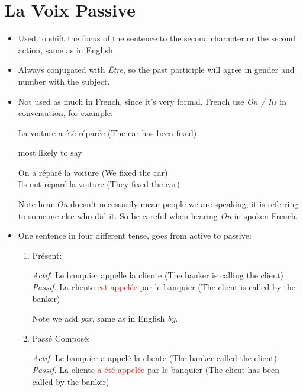 \documentclass{book}
\begin{document}
\chapter{La Voix Passive}
    \begin{itemize}
        \item Used to shift the focus of the sentence to the second character or the second action, same as in English.
        \item Always conjugated with \textit{Être}, so the past participle will agree in gender and number with the subject.
        \item Not used as much in French, since it's very formal. French use \textit{On / Ils} in conversation, for example:
            \begin{center}
                La voiture a été réparée (The car has been fixed)
            \end{center}
            most likely to say 
            \begin{center}
                On a réparé la voiture (We fixed the car) \\
                Ils ont réparé la voiture (They fixed the car)
            \end{center}
            Note hear \textit{On} doesn't necessarily mean people we are speaking, it is referring to someone else who did it. So be careful when hearing \textit{On} in spoken French.
        \item One sentence in four different tense, goes from active to passive:
            \begin{enumerate}
                \item Présent:
                    \begin{center}
                        \textit{Actif.} Le banquier appelle la cliente (The banker is calling the client) \\
                        \textit{Passif.} La cliente \textcolor{red}{est appelée} par le banquier (The client is called by the banker)
                    \end{center}
                    Note we add \textit{par}, same as in English \textit{by}.

                \item Passé Composé:
                    \begin{center}
                        \textit{Actif.} Le banquier a appelé la cliente (The banker called the client) \\
                        \textit{Passif.} La cliente \textcolor{red}{a été appelée} par le banquier (The client has been called by the banker)
                    \end{center}


\end{enumerate}
\end{itemize}
\end{document}

